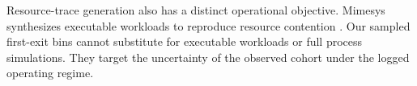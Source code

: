 Resource-trace generation also has a distinct operational objective. Mimesys
synthesizes executable workloads to reproduce resource contention
\citep{kim2026}. Our sampled first-exit bins cannot substitute for executable
workloads or full process simulations. They target the uncertainty of the
observed cohort under the logged operating regime.
